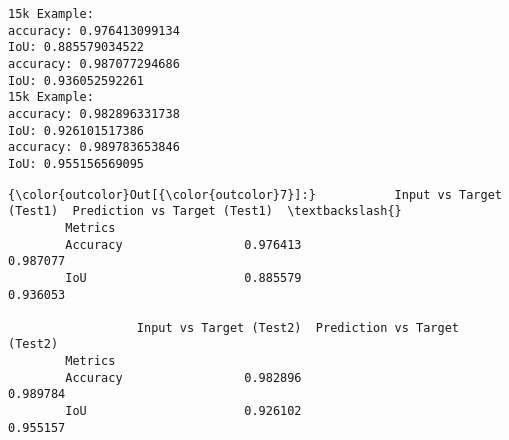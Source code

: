 \documentclass[11pt]{article}
\begin{document}
    \begin{Verbatim}[commandchars=\\\{\}]
15k Example: 
accuracy: 0.976413099134
IoU: 0.885579034522
accuracy: 0.987077294686
IoU: 0.936052592261
15k Example: 
accuracy: 0.982896331738
IoU: 0.926101517386
accuracy: 0.989783653846
IoU: 0.955156569095

    \end{Verbatim}

\begin{Verbatim}[commandchars=\\\{\}]
{\color{outcolor}Out[{\color{outcolor}7}]:}           Input vs Target (Test1)  Prediction vs Target (Test1)  \textbackslash{}
        Metrics                                                           
        Accuracy                 0.976413                      0.987077   
        IoU                      0.885579                      0.936053   
        
                  Input vs Target (Test2)  Prediction vs Target (Test2)  
        Metrics                                                          
        Accuracy                 0.982896                      0.989784  
        IoU                      0.926102                      0.955157  
\end{Verbatim}
            
    \begin{center}
    \end{center}
    { \hspace*{\fill} \\}
    
    \begin{center}
    \end{center}
    { \hspace*{\fill} \\}
    
    \begin{center}
    \end{center}
    { \hspace*{\fill} \\}
    
    \begin{center}
    \end{center}
    { \hspace*{\fill} \\}
    
\end{document}
